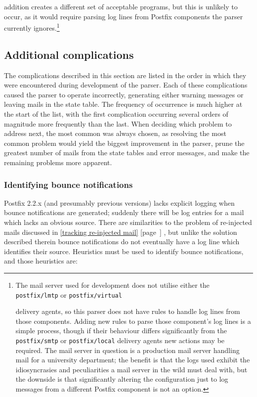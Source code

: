 \documentclass[a4paper,12pt,draft]{article}
\newcommand{\refwithpage}[1]{%
    \empty{}\ref{#1} [page~\pageref{#1}]%
}
\newcommand{\sectionref}[1]{%
    \textsection{}\refwithpage{#1}%
}
\newcommand{\daemon}[1]{%
    \texttt{postfix/#1}%
}
\begin{document}
addition creates a different set of acceptable programs, but this is
unlikely to occur, as it would require parsing log lines from Postfix
components the parser currently ignores.\footnote{The mail server used for
development does not utilise either the \daemon{lmtp} or \daemon{virtual}
delivery agents, so this parser does not have rules to handle log lines
from those components.  Adding new rules to parse those component's log
lines is a simple process, though if their behaviour differs significantly
from the \daemon{smtp} or \daemon{local} delivery agents new actions may be
required.  The mail server in question is a production mail server handling
mail for a university department; the benefit is that the logs used exhibit
the idiosyncrasies and peculiarities a mail server in the wild must deal
with, but the downside is that significantly altering the configuration
just to log messages from a different Postfix component is not an option.}


\subsection{Additional complications}

\label{additional complications}

The complications described in this section are listed in the order in
which they were encountered during development of the parser.  Each of
these complications caused the parser to operate incorrectly, generating
either warning messages or leaving mails in the state table.  The frequency
of occurrence is much higher at the start of the list, with the first
complication occurring several orders of magnitude more frequently than the
last.  When deciding which problem to address next, the most common was
always chosen, as resolving the most common problem would yield the biggest
improvement in the parser, prune the greatest number of mails from
the state tables and error messages, and make the remaining problems more
apparent.


\subsubsection{Identifying bounce notifications}

\label{identifying-bounce-notifications}

Postfix 2.2.x (and presumably previous versions) lacks explicit logging
when bounce notifications are generated; suddenly there will be log entries
for a mail which lacks an obvious source.  There are similarities to the
problem of re-injected mails discussed in \sectionref{tracking re-injected
mail}, but unlike the solution described therein bounce notifications do
not eventually have a log line which identifies their source.  Heuristics
must be used to identify bounce notifications, and those heuristics are:
\end{document}
